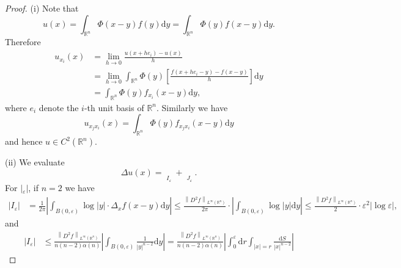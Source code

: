 \begin{proof}
(i) Note that 
$$
u\left( x \right) =\int_{\mathbb{R} ^n}{\Phi \left( x-y \right) f\left( y \right) \mathrm{d}y}=\int_{\mathbb{R} ^n}{\Phi \left( y \right) f\left( x-y \right) \mathrm{d}y}.
$$
Therefore 
$$
\begin{aligned}
u_{x_i}\left( x \right) &=\lim_{h\rightarrow 0} \frac{u\left( x+he_i \right) -u\left( x \right)}{h}
\\
&=\lim_{h\rightarrow 0} \int_{\mathbb{R} ^n}{\Phi \left( y \right) \left[ \frac{f\left( x+he_i-y \right) -f\left( x-y \right)}{h} \right] \mathrm{d}y}
\\
&=\int_{\mathbb{R} ^n}{\Phi \left( y \right) f_{x_i}\left( x-y \right) \mathrm{d}y},
\end{aligned}
$$
where $e_i$ denote the $i$-th unit basis of $\mathbb{R}^n$. Similarly we have 
$$
u_{x_jx_i}\left( x \right) =\int_{\mathbb{R} ^n}{\Phi \left( y \right) f_{x_jx_i}\left( x-y \right) \mathrm{d}y}
$$
and hence $u\in C^2(\mathbb{R}^n)$.\par
(ii) We evaluate 
$$
\Delta u\left( x \right) =\mathop {\underbrace{\int_{B\left( 0,\varepsilon \right)}{\Phi \left( y \right) \Delta _xf\left( x-y \right) \mathrm{d}y}}} \limits_{I_{\varepsilon}}+\mathop {\underbrace{\int_{\mathbb{R} \setminus B\left( 0,\varepsilon \right)}{\Phi \left( y \right) \Delta _xf\left( x-y \right) \mathrm{d}y}}} \limits_{J_{\varepsilon}}.
$$
For $|_\varepsilon|$, if $n=2$ we have 
$$
\begin{aligned}
\left| I_{\varepsilon} \right|&=\frac{1}{2\pi}\left| \int_{B\left( 0,\varepsilon \right)}{\log \left| y \right|\cdot \Delta _xf\left( x-y \right) \mathrm{d}y} \right|\le \frac{\left\| D^2f \right\| _{L^{\infty}\left( \mathbb{R} ^n \right)}}{2\pi}\cdot \left| \int_{B\left( 0,\varepsilon \right)}{\log \left| y \right|\mathrm{d}y} \right|\le \frac{\left\| D^2f \right\| _{L^{\infty}\left( \mathbb{R} ^n \right)}}{2}\cdot \varepsilon ^2\left| \log \varepsilon \right|,
\end{aligned}
$$
and 
$$
\begin{aligned}
\left| I_{\varepsilon} \right|&\le \frac{\left\| D^2f \right\| _{L^{\infty}\left( \mathbb{R} ^n \right)}}{n\left( n-2 \right) \alpha \left( n \right)}\left| \int_{B\left( 0,\varepsilon \right)}{\frac{1}{\left| y \right|^{n-2}}\mathrm{d}y} \right|= \frac{\left\| D^2f \right\| _{L^{\infty}\left( \mathbb{R} ^n \right)}}{n\left( n-2 \right) \alpha \left( n \right)}\left| \int_0^{\varepsilon}{\mathrm{d}r\int_{\left| x \right|=r}{\frac{\mathrm{d}S}{\left| x \right|^{n-2}}}} \right|

\end{aligned}$$
\end{proof}

